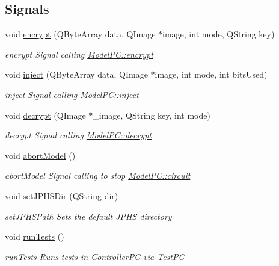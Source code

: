 \subsection*{Signals}
\begin{DoxyCompactItemize}
\item 
void \hyperlink{class_view_p_c_a9d179ff85ed8b1ca0ff7fa495965b52d}{encrypt} (Q\-Byte\-Array data, Q\-Image $\ast$image, int mode, Q\-String key)
\begin{DoxyCompactList}\small\item\em encrypt Signal calling \hyperlink{class_model_p_c_a6f191f62d4635d0d3555fcc0be298794}{Model\-P\-C\-::encrypt} \end{DoxyCompactList}\item 
void \hyperlink{class_view_p_c_a652c98014c2df32178d43a5a9612dd99}{inject} (Q\-Byte\-Array data, Q\-Image $\ast$image, int mode, int bits\-Used)
\begin{DoxyCompactList}\small\item\em inject Signal calling \hyperlink{class_model_p_c_aada6a04d81ada8f2b4ba18108c8d6f10}{Model\-P\-C\-::inject} \end{DoxyCompactList}\item 
void \hyperlink{class_view_p_c_a365df051360d557c7221474ad856e0af}{decrypt} (Q\-Image $\ast$\-\_\-image, Q\-String key, int mode)
\begin{DoxyCompactList}\small\item\em decrypt Signal calling \hyperlink{class_model_p_c_a5995215a34a1e1f504035715a8013809}{Model\-P\-C\-::decrypt} \end{DoxyCompactList}\item 
void \hyperlink{class_view_p_c_aa652102ce6b5757b8eef830409c8cabf}{abort\-Model} ()
\begin{DoxyCompactList}\small\item\em abort\-Model Signal calling to stop \hyperlink{class_model_p_c_a1d0091062a0c836b283ec2f67411623b}{Model\-P\-C\-::circuit} \end{DoxyCompactList}\item 
void \hyperlink{class_view_p_c_ae81085836c0c01bc9556a5b27eb8d19c}{set\-J\-P\-H\-S\-Dir} (Q\-String dir)
\begin{DoxyCompactList}\small\item\em set\-J\-P\-H\-S\-Path Sets the default J\-P\-H\-S directory \end{DoxyCompactList}\item 
void \hyperlink{class_view_p_c_a96a6c95728bf20c64d2a8fe978495395}{run\-Tests} ()
\begin{DoxyCompactList}\small\item\em run\-Tests Runs tests in \hyperlink{class_controller_p_c}{Controller\-P\-C} via Test\-P\-C \end{DoxyCompactList}\end{DoxyCompactItemize}
